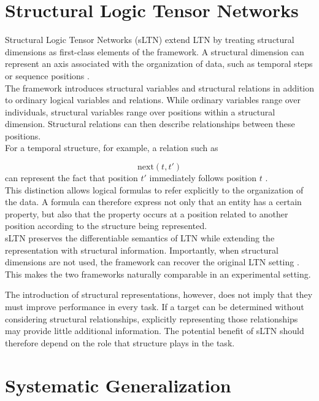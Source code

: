 \section{Structural Logic Tensor Networks}

\noindent
Structural Logic Tensor Networks (sLTN) extend LTN by treating structural dimensions as first-class elements of the framework. A structural dimension can represent an axis associated with the organization of data, such as temporal steps or sequence positions \cite{rinaldi2026sltn}.
\noindent\\
The framework introduces structural variables and structural relations in addition to ordinary logical variables and relations. While ordinary variables range over individuals, structural variables range over positions within a structural dimension. Structural relations can then describe relationships between these positions.
\noindent\\
For a temporal structure, for example, a relation such as

$$
\mathrm{next}(t,t')
$$
\noindent
can represent the fact that position $t'$ immediately follows position $t$ \cite{rinaldi2026sltn}.
\noindent\\
This distinction allows logical formulas to refer explicitly to the organization of the data. A formula can therefore express not only that an entity has a certain property, but also that the property occurs at a position related to another position according to the structure being represented.
\noindent\\
sLTN preserves the differentiable semantics of LTN while extending the representation with structural information. Importantly, when structural dimensions are not used, the framework can recover the original LTN setting \cite{rinaldi2026sltn}. This makes the two frameworks naturally comparable in an experimental setting.

\noindent
The introduction of structural representations, however, does not imply that they must improve performance in every task. If a target can be determined without considering structural relationships, explicitly representing those relationships may provide little additional information. The potential benefit of sLTN should therefore depend on the role that structure plays in the task.

\section{Systematic Generalization}


